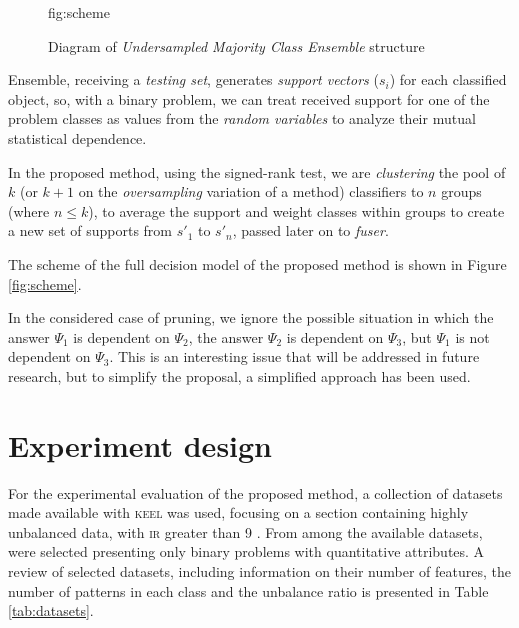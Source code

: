 \documentclass[pmlr]{jmlr}
\begin{document}
\begin{figure}[!h]
\floatconts
  {fig:scheme}
  {\caption{Diagram of \emph{Undersampled Majority Class Ensemble} structure}}
  {}
\end{figure}

Ensemble, receiving a \emph{testing set}, generates \emph{support vectors} ($s_i$) for each classified object, so, with a binary problem, we can treat received support for one of the problem classes as values from the \emph{random variables} to analyze their mutual statistical dependence.

In the proposed method, using the signed-rank test, we are \emph{clustering} the pool of $k$ (or $k+1$ on the \emph{oversampling} variation of a method) classifiers to $n$ groups (where $n\leq k$), to average the support and weight classes within groups to create a new set of supports from $s'_1$ to $s'_n$, passed later on to \emph{fuser}.

The scheme of the full decision model of the proposed method is shown in Figure \ref{fig:scheme}.

\begin{note}
In the considered case of pruning, we ignore the possible situation in which the answer $\Psi_1$ is dependent on $\Psi_2$, the answer $\Psi_2$ is dependent on $ \Psi_3$, but $\Psi_1$ is not dependent on $\Psi_3$. This is an interesting issue that will be addressed in future research, but to simplify the proposal, a simplified approach has been used.
\end{note}

\section{Experiment design}
\label{sec:intro}

For the experimental evaluation of the proposed method, a collection of datasets made available with \textsc{keel} \citep{alcala2011keel} was used, focusing on a section containing highly unbalanced data, with \textsc{ir} greater than 9 \citep{fernandez2009hierarchical}. From among the available datasets,  were selected presenting only binary problems with quantitative attributes. A review of selected datasets, including information on their number of features, the number of patterns in each class and the unbalance ratio is presented in Table \ref{tab:datasets}.
\end{document}
